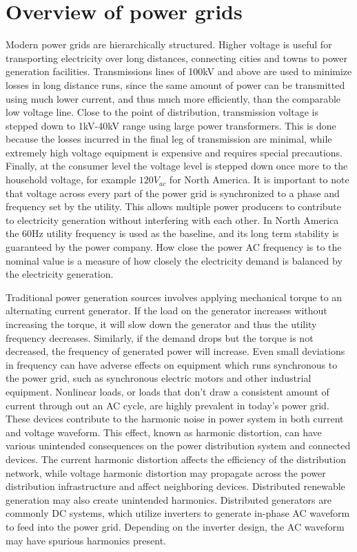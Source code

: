 \section{Overview of power grids}\label{sec:overview-of-power-grids}
Modern power grids are hierarchically structured.
Higher voltage is useful for transporting electricity over long distances, connecting cities and towns to power generation facilities.
Transmissions lines of 100kV and above are used to minimize losses in long distance runs, since the same amount of power can be transmitted using much lower current, and thus much more efficiently, than the comparable low voltage line.
Close to the point of distribution, transmission voltage is stepped down to 1kV-40kV range using large power transformers.
This is done because the losses incurred in the final leg of transmission are minimal, while extremely high voltage equipment is expensive and requires special precautions.\cite{sivanagaraju2008electric} Finally, at the consumer level the voltage level is stepped down once more to the household voltage, for example $120V_{ac}$ for North America.
It is important to note that voltage across every part of the power grid is synchronized to a phase and frequency set by the utility.
This allows multiple power producers to contribute to electricity generation without interfering with each other.\cite{blaabjerg2006overview} In North America the 60Hz utility frequency is used as the baseline, and its long term stability is guaranteed by the power company.
How close the power AC frequency is to the nominal value is a measure of how closely the electricity demand is balanced by the electricity generation.


Traditional power generation sources involves applying mechanical torque to an alternating current generator.
If the load on the generator increases without increasing the torque, it will slow down the generator and thus the utility frequency decreases.
Similarly, if the demand drops but the torque is not decreased, the frequency of generated power will increase.
Even small deviations in frequency can have adverse effects on equipment which runs synchronous to the power grid, such as synchronous electric motors and other industrial equipment.\cite{morren2006wind} Nonlinear loads, or loads that don't draw a consistent amount of current through out an AC cycle, are highly prevalent in today's power grid.
These devices contribute to the harmonic noise in power system in both current and voltage waveform.
This effect, known as harmonic distortion, can have various unintended consequences on the power distribution system and connected devices.
The current harmonic distortion affects the efficiency of the distribution network, while voltage harmonic distortion may propagate across the power distribution infrastructure and affect neighboring devices.\cite{muhamad2007effects} Distributed renewable generation may also create unintended harmonics.
Distributed generators are commonly DC systems, which utilize inverters to generate in-phase AC waveform to feed into the power grid.
Depending on the inverter design, the AC waveform may have spurious harmonics present.\cite{morren2006wind}

